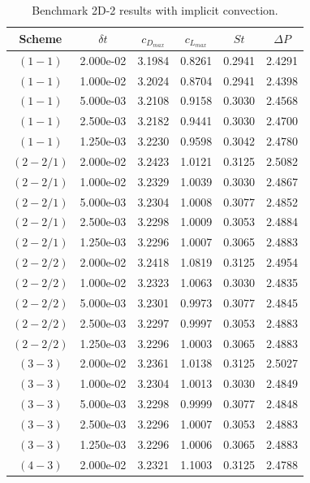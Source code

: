 \begin{table}[h!]
	\caption{Benchmark 2D-2 results with implicit convection.}
	\label{tab:IMEX-RK_cyl2d_implconv}
	\centering
	\begin{tabular} {cccccc}
		\toprule
			Scheme & $\delta t$ & $c_{D_{max}}$ & $c_{L_{max}}$ & $St$ & $\Delta P$  \\
		\midrule
		\midrule
			$(1-1)$ & 2.000e-02 & 3.1984 & 0.8261 & 0.2941 & 2.4291 \\ 
			$(1-1)$ & 1.000e-02 & 3.2024 & 0.8704 & 0.2941 & 2.4398 \\ 
			$(1-1)$ & 5.000e-03 & 3.2108 & 0.9158 & 0.3030 & 2.4568 \\ 
			$(1-1)$ & 2.500e-03 & 3.2182 & 0.9441 & 0.3030 & 2.4700 \\ 
			$(1-1)$ & 1.250e-03 & 3.2230 & 0.9598 & 0.3042 & 2.4780 \\  
		\midrule
			$(2-2/1)$ & 2.000e-02 & 3.2423 & 1.0121 & 0.3125 & 2.5082 \\ 
			$(2-2/1)$ & 1.000e-02 & 3.2329 & 1.0039 & 0.3030 & 2.4867 \\ 
			$(2-2/1)$ & 5.000e-03 & 3.2304 & 1.0008 & 0.3077 & 2.4852 \\ 
			$(2-2/1)$ & 2.500e-03 & 3.2298 & 1.0009 & 0.3053 & 2.4884 \\ 
			$(2-2/1)$ & 1.250e-03 & 3.2296 & 1.0007 & 0.3065 & 2.4883 \\  
		\midrule
			$(2-2/2)$ & 2.000e-02 & 3.2418 & 1.0819 & 0.3125 & 2.4954 \\ 
			$(2-2/2)$ & 1.000e-02 & 3.2323 & 1.0063 & 0.3030 & 2.4835 \\ 
			$(2-2/2)$ & 5.000e-03 & 3.2301 & 0.9973 & 0.3077 & 2.4845 \\ 
			$(2-2/2)$ & 2.500e-03 & 3.2297 & 0.9997 & 0.3053 & 2.4883 \\ 
			$(2-2/2)$ & 1.250e-03 & 3.2296 & 1.0003 & 0.3065 & 2.4883 \\  
		\midrule
			$(3-3)$ & 2.000e-02 & 3.2361 & 1.0138 & 0.3125 & 2.5027 \\ 
			$(3-3)$ & 1.000e-02 & 3.2304 & 1.0013 & 0.3030 & 2.4849 \\ 
			$(3-3)$ & 5.000e-03 & 3.2298 & 0.9999 & 0.3077 & 2.4848 \\ 
			$(3-3)$ & 2.500e-03 & 3.2296 & 1.0007 & 0.3053 & 2.4883 \\ 
			$(3-3)$ & 1.250e-03 & 3.2296 & 1.0006 & 0.3065 & 2.4883 \\  
		\midrule
			$(4-3)$ & 2.000e-02 & 3.2321 & 1.1003 & 0.3125 & 2.4788 \\ 

\end{tabular}
\end{table}
